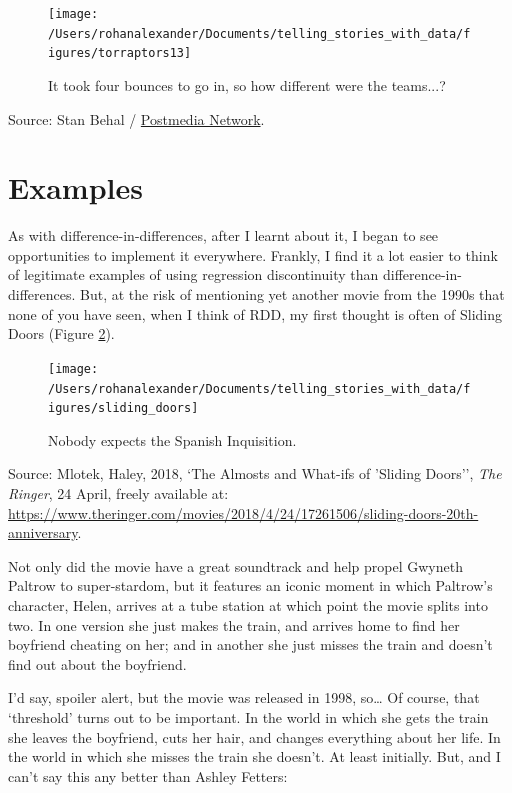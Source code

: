 \documentclass[
]{book}
\begin{document}
\begin{figure}
\texttt{[image: /Users/rohanalexander/Documents/telling\_stories\_with\_data/figures/torraptors13]} \caption{It took four bounces to go in, so how different were the teams...?}\label{fig:kawai}
\end{figure}

Source: Stan Behal / \href{https://nationalpost.com/sports/kawhi-leonard-miracle-shot-toronto-raptors-game-7-scott-stinson-kawhi-leonards-miracle-shot-sends-toronto-raptors-into-game-7-elation}{Postmedia Network}.

\hypertarget{examples}{%
\section{Examples}\label{examples}}

As with difference-in-differences, after I learnt about it, I began to see opportunities to implement it everywhere. Frankly, I find it a lot easier to think of legitimate examples of using regression discontinuity than difference-in-differences. But, at the risk of mentioning yet another movie from the 1990s that none of you have seen, when I think of RDD, my first thought is often of Sliding Doors (Figure \ref{fig:slidingdoors}).

\begin{figure}
\texttt{[image: /Users/rohanalexander/Documents/telling\_stories\_with\_data/figures/sliding\_doors]} \caption{Nobody expects the Spanish Inquisition.}\label{fig:slidingdoors}
\end{figure}

Source: Mlotek, Haley, 2018, `The Almosts and What-ifs of 'Sliding Doors'', \emph{The Ringer}, 24 April, freely available at: \url{https://www.theringer.com/movies/2018/4/24/17261506/sliding-doors-20th-anniversary}.

Not only did the movie have a great soundtrack and help propel Gwyneth Paltrow to super-stardom, but it features an iconic moment in which Paltrow's character, Helen, arrives at a tube station at which point the movie splits into two. In one version she just makes the train, and arrives home to find her boyfriend cheating on her; and in another she just misses the train and doesn't find out about the boyfriend.

I'd say, spoiler alert, but the movie was released in 1998, so\ldots{} Of course, that `threshold' turns out to be important. In the world in which she gets the train she leaves the boyfriend, cuts her hair, and changes everything about her life. In the world in which she misses the train she doesn't. At least initially. But, and I can't say this any better than Ashley Fetters:
\end{document}
